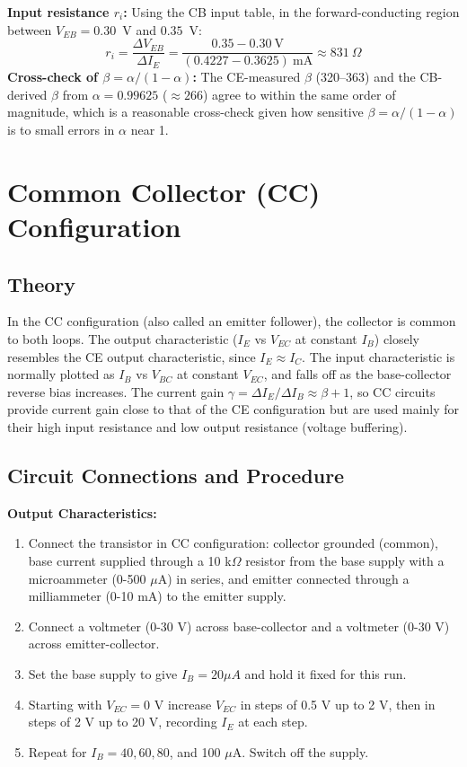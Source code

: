 \documentclass[12pt,a4paper]{article}
\begin{document}
\textbf{Input resistance $r_i$:} Using the CB input table, in the forward-conducting region between
$V_{EB}=0.30$~V and $0.35$~V:
\[
r_i = \frac{\Delta V_{EB}}{\Delta I_E} = \frac{0.35-0.30\ \text{V}}{(0.4227-0.3625)\ \text{mA}} \approx 831\ \Omega
\]
\textbf{Cross-check of $\beta = \alpha/(1-\alpha)$:} The CE-measured $\beta$ (320--363) and the
CB-derived $\beta$ from $\alpha=0.99625$ ($\approx 266$) agree to within the same order of magnitude,
which is a reasonable cross-check given how sensitive $\beta=\alpha/(1-\alpha)$ is to small errors in
$\alpha$ near 1.
 
\section{Common Collector (CC) Configuration}

\subsection{Theory}
In the CC configuration (also called an emitter follower), the collector is common to both loops. The output characteristic ($I_E$ vs $V_{EC}$ at constant $I_B$) closely resembles the CE output characteristic, since $I_E \approx I_C$. The input characteristic is normally plotted as $I_B$ vs $V_{BC}$ at constant $V_{EC}$, and falls off as the base-collector reverse bias increases. The current gain $\gamma=\Delta I_E/\Delta I_B \approx \beta+1$, so CC circuits provide current gain close to that of the CE configuration but are used mainly for their high input resistance and low output resistance (voltage buffering).

\subsection{Circuit Connections and Procedure}
\textbf{Output Characteristics:}
\begin{enumerate}
    \item Connect the transistor in CC configuration: collector grounded (common), base current supplied through a 10 k$\Omega$ resistor from the base supply with a microammeter (0-500 $\mu$A) in series, and emitter connected through a milliammeter (0-10 mA) to the emitter supply.
    \item Connect a voltmeter (0-30 V) across base-collector and a voltmeter (0-30 V) across emitter-collector.
    \item Set the base supply to give $I_B=20\mu A$ and hold it fixed for this run.
    \item Starting with $V_{EC}=0$ V increase $V_{EC}$ in steps of 0.5 V up to 2 V, then in steps of 2 V up to 20 V, recording $I_E$ at each step.
    \item Repeat for $I_B=40, 60, 80$, and 100 $\mu$A. Switch off the supply.
\end{enumerate}
\end{document}
